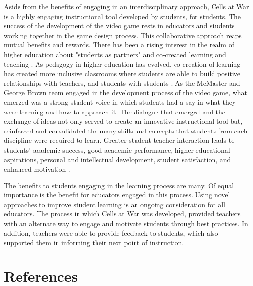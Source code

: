 \documentclass[10pt]{article}
\begin{document}
Aside from the benefits of engaging in an interdisciplinary approach, Cells at War is a highly engaging instructional tool developed by students, for students. The success of the development of the video game rests in educators and students working together in the game design process. This collaborative approach reaps mutual benefits and rewards. There has been a rising interest in the realm of higher education about "students as partners" and co-created learning and teaching \citep{felten2014engaging, dunne2016design, mercer2017systematic, bovill2020co}. As pedagogy in higher education has evolved, co-creation of learning has created more inclusive classrooms where students are able to build positive relationships with teachers, and students with students \citep{bovill2020co}. As the McMaster and George Brown team engaged in the development process of the video game, what emerged was a strong student voice in which students had a say in what they were learning and how to approach it. The dialogue that emerged and the exchange of ideas not only served to create an innovative instructional tool but, reinforced and consolidated the many skills and concepts that students from each discipline were required to learn. Greater student-teacher interaction leads to students’ academic success, good academic performance, higher educational aspirations, personal and intellectual development, student satisfaction, and enhanced motivation \citep{bovill2020co}.

The benefits to students engaging in the learning process are many. Of equal importance is the benefit for educators engaged in this process. Using novel approaches to improve student learning is an ongoing consideration for all educators. The process in which Cells at War was developed, provided teachers with an alternate way to engage and motivate students through best practices. In addition, teachers were able to provide feedback to students, which also supported them in informing their next point of instruction. 


\clearpage\newpage
\section{References}


\nocite{*}
\printbibliography[heading=none, sorting=nyt]
\newpage
\end{document}
